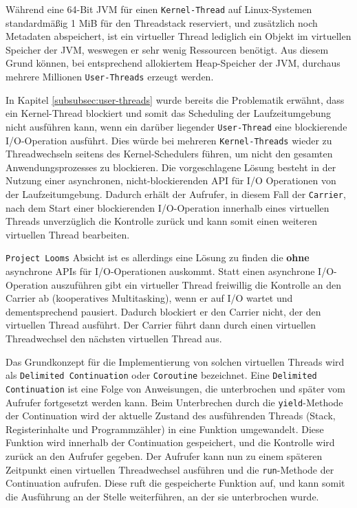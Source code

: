 Während eine 64-Bit JVM für einen \verb|Kernel-Thread| auf Linux-Systemen standardmäßig 1 MiB für den Threadstack reserviert\parencite{OpenJDKGitHub},
und zusätzlich noch Metadaten abspeichert, ist ein virtueller Thread
lediglich ein Objekt im virtuellen Speicher der JVM, weswegen er sehr wenig Ressourcen benötigt.
Aus diesem Grund können, bei entsprechend allokiertem Heap-Speicher der JVM, durchaus mehrere Millionen \verb|User-Threads| erzeugt werden.\newline

In Kapitel \ref{subsubsec:user-threads} wurde bereits die Problematik erwähnt, dass ein Kernel-Thread blockiert und somit
das Scheduling der Laufzeitumgebung nicht ausführen kann, wenn ein darüber liegender \verb|User-Thread| eine blockierende I/O-Operation ausführt.
Dies würde bei mehreren \verb|Kernel-Threads| wieder zu Threadwechseln seitens des Kernel-Schedulers führen, um nicht den gesamten Anwendungsprozesses
zu blockieren.
Die vorgeschlagene Lösung besteht in der Nutzung einer asynchronen, nicht-blockierenden API für I/O Operationen von der Laufzeitumgebung.
Dadurch erhält der Aufrufer, in diesem Fall der \verb|Carrier|, nach dem Start einer blockierenden I/O-Operation
innerhalb eines virtuellen Threads unverzüglich die Kontrolle zurück und kann somit einen weiteren virtuellen Thread bearbeiten.

\verb|Project Looms| Absicht ist es allerdings eine Lösung zu finden die \textbf{ohne} asynchrone APIs für I/O-Operationen auskommt.
Statt einen asynchrone I/O-Operation auszuführen gibt ein virtueller Thread freiwillig die Kontrolle an den Carrier ab (kooperatives Multitasking),
wenn er auf I/O wartet und dementsprechend pausiert. Dadurch blockiert er den Carrier nicht, der den virtuellen Thread ausführt.
Der Carrier führt dann durch einen virtuellen Threadwechsel den nächsten virtuellen Thread aus.

Das Grundkonzept für die Implementierung von solchen virtuellen Threads wird als \verb|Delimited Continuation| oder \verb|Coroutine| bezeichnet.
Eine \verb|Delimited Continuation| ist eine Folge von Anweisungen, die unterbrochen und später vom Aufrufer fortgesetzt werden kann.
Beim Unterbrechen durch die \verb|yield|-Methode der Continuation wird der aktuelle Zustand des ausführenden Threads
(Stack, Registerinhalte und Programmzähler) in eine Funktion umgewandelt.
Diese Funktion wird innerhalb der Continuation gespeichert, und die Kontrolle wird zurück an den Aufrufer gegeben.
Der Aufrufer kann nun zu einem späteren Zeitpunkt einen virtuellen Threadwechsel ausführen und die \verb|run|-Methode der Continuation aufrufen.
Diese ruft die gespeicherte Funktion auf, und kann somit die Ausführung an der Stelle weiterführen, an der sie unterbrochen wurde.

